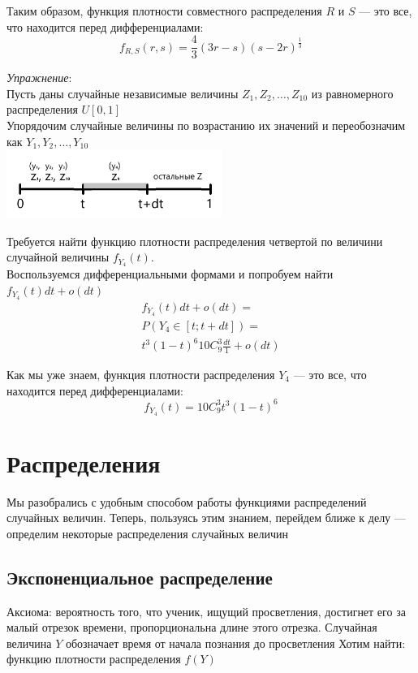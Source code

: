 \documentclass[12pt]{article} %
\theoremstyle{definition} %
\begin{document}
Таким образом, функция плотности совместного распределения $R$ и $S$ — это все, что находится перед дифференциалами:
\[
    f_{R,S}(r,s) = \frac{4}{3}(3 r - s)(s - 2 r)^{\frac{1}{3}}
\]



\textit{Упражнение}:\\
Пусть даны случайные независимые величины $Z_1, Z_2, \ldots, Z_{10}$ из равномерного распределения $U[0,1]$\\
Упорядочим случайные величины по возрастанию их значений и переобозначим как $Y_1, Y_2, \ldots, Y_{10}$\\
\includegraphics[width=7cm]{images/05_pic4.png}

Требуется найти функцию плотности распределения четвертой по величини случайной величины $f_{Y_4}(t)$.\\
Воспользуемся дифференциальными формами и попробуем найти $f_{Y_4}(t) dt + o(dt)$
\begin{eqnarray*}
    f_{Y_4}(t) dt + o(dt) =\\
    P(Y_4 \in [t; t + dt]) =\\
    t^3 (1 - t)^6 10  C_9^3 \frac{dt}{1} + o(dt)
\end{eqnarray*}

Как мы уже знаем, функция плотности распределения $Y_4$ — это все, что находится перед дифференциалами:
\[
    f_{Y_4}(t) = 10 C_9^3 t^3 (1 - t)^6
\]


\section{Распределения}
Мы разобрались с удобным способом работы функциями распределений случайных величин. Теперь, пользуясь этим знанием, перейдем ближе к делу — определим некоторые распределения случайных величин
\subsection{Экспоненциальное распределение}
Аксиома: вероятность того, что ученик, ищущий просветления, достигнет его за малый отрезок времени, пропорциональна длине этого отрезка.
Случайная величина $Y$ обозначает время от начала познания до просветления
Хотим найти: функцию плотности распределения $f(Y)$
\end{document}
